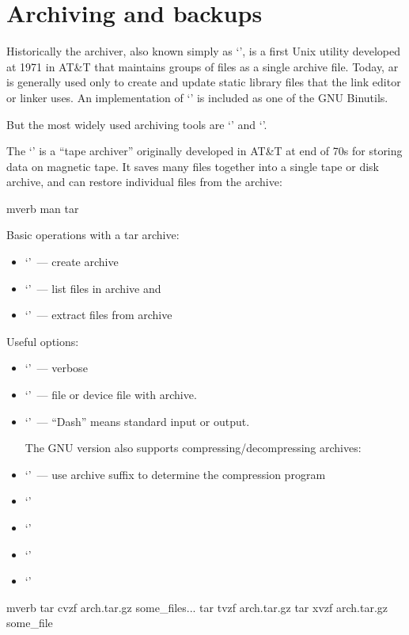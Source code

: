 \section*{Archiving and backups} %

Historically the archiver, also known simply as `', is a first Unix
utility developed at 1971 in AT\&T that maintains groups of files as a single
archive file. Today, ar is generally used only to create and update static
library files that the link editor or linker uses. An implementation of
`' is included as one of the GNU Binutils.

But the most widely used archiving tools are `' and `'.

The `' is a ``tape archiver'' originally developed in AT\&T at end of
70s for storing data on magnetic tape. It saves many files together into
a single tape or disk archive, and can restore individual files from the archive:
\begin{code}{mverb}
man tar
\end{code}
Basic operations with a tar archive:
\begin{itemize}
\item `'~--- create archive
\item `'~--- list files in archive and
\item `'~--- extract files from archive
\end{itemize}
Useful options:
\begin{itemize}
\item `'~--- verbose
\item `'~--- file or device file with archive.
\item `\cmd{-}'~--- ``Dash'' means standard input or output.

      The GNU version also supports compressing/decompressing archives:
\item `'~--- use archive suffix to determine
      the compression program
\item `'
\item `'
\item `'
\item `'
\end{itemize}
\begin{code}{mverb}
tar cvzf arch.tar.gz some_files...
tar tvzf arch.tar.gz
tar xvzf arch.tar.gz some_file
\end{code}
